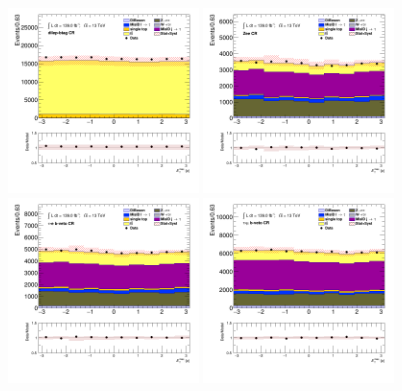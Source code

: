 		\begin{figure}[!htp]
			\begin{center}    
			\includegraphics[width=0.45\textwidth]{chapters/chapter6_HPlus/images/taulep/met_phi_DILEP_BTAG.png}
			\includegraphics[width=0.45\textwidth]{chapters/chapter6_HPlus/images/taulep/met_phi_ZEE.png} \\
			\includegraphics[width=0.45\textwidth]{chapters/chapter6_HPlus/images/taulep/met_phi_TAUEL_BVETO.png} 
			\includegraphics[width=0.45\textwidth]{chapters/chapter6_HPlus/images/taulep/met_phi_TAUMU_BVETO.png} \\

\end{center}
\end{figure}
